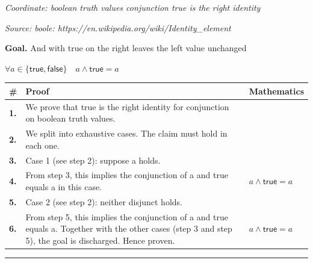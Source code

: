 \documentclass[11pt]{article}
\theoremstyle{definition}
\begin{document}
\smallskip\noindent\textit{Coordinate: boolean truth values \cdot conjunction \cdot true is the right identity}\par
\smallskip\noindent\textit{Source: boole: https://en.wikipedia.org/wiki/Identity\_element}\par
\medskip
\noindent\textbf{Goal.} And with true on the right leaves the left value unchanged\par
\noindent$\displaystyle \forall a \in \{\mathsf{true}, \mathsf{false}\}\quad a \land \mathsf{true} = a$\par
\medskip
\noindent
\begin{tabular}{@{} >{\raggedright\arraybackslash}p{} >{\raggedright\arraybackslash}p{} >{\raggedleft\arraybackslash}p{} @{}}
\textbf{\#} & \textbf{Proof} & \textbf{Mathematics} \\
\midrule
\textbf{1.} & We prove that true is the right identity for conjunction on boolean truth values. & \\[0.45em]
\textbf{2.} & We split into exhaustive cases. The claim must hold in each one. & \\[0.45em]
\textbf{3.} & Case 1 (see step 2): suppose a holds. & \\[0.45em]
\textbf{4.} & From step 3, this implies the conjunction of a and true equals a in this case. & $\displaystyle a \land \mathsf{true} = a$ \\[0.45em]
\textbf{5.} & Case 2 (see step 2): neither disjunct holds. & \\[0.45em]
\textbf{6.} & From step 5, this implies the conjunction of a and true equals a. Together with the other cases (step 3 and step 5), the goal is discharged. Hence proven. & $\displaystyle a \land \mathsf{true} = a$ \\[0.45em]
\bottomrule
\end{tabular}
\label{thm:Bool-conjunction-true_is_the_right_identity}
\par\medskip\hrule
\end{document}
